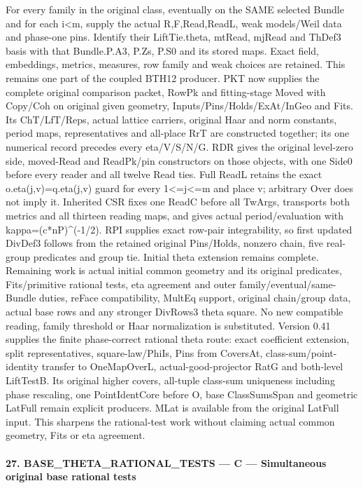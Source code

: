 \documentclass[11pt,a4paper]{article}
\numberwithin{equation}{section}
\theoremstyle{remark}\newtheorem{remark}[theorem]{Remark}
\begin{document}
For every family in the original class, eventually on the SAME selected Bundle and for each i<m, supply the actual R,F,Read,ReadL, weak models/Weil data and phase-one pins. Identify their LiftTie.theta, mtRead, mjRead and ThDef3 basis with that Bundle.P.A3, P.Zs, P.S0 and its stored maps. Exact field, embeddings, metrics, measures, row family and weak choices are retained. This remains one part of the coupled BTH12 producer. PKT now supplies the complete original comparison packet, RowPk and fitting-stage Moved with Copy/Coh on original given geometry, Inputs/Pins/Holds/ExAt/InGeo and Fits. Its ChT/LfT/Reps, actual lattice carriers, original Haar and norm constants, period maps, representatives and all-place RrT are constructed together; its one numerical record precedes every eta/V/S/N/G. RDR gives the original level-zero side, moved-Read and ReadPk/pin constructors on those objects, with one Side0 before every reader and all twelve Read ties. Full ReadL retains the exact o.eta(j,v)=q.eta(j,v) guard for every 1<=j<=m and place v; arbitrary Over does not imply it. Inherited CSR fixes one ReadC before all TwArgs, transports both metrics and all thirteen reading maps, and gives actual period/evaluation with kappa=(c*nP)\textasciicircum{}(-1/2). RPI supplies exact row-pair integrability, so first updated DivDef3 follows from the retained original Pins/Holds, nonzero chain, five real-group predicates and group tie. Initial theta extension remains complete. Remaining work is actual initial common geometry and its original predicates, Fits/primitive rational tests, eta agreement and outer family/eventual/same-Bundle duties, reFace compatibility, MultEq support, original chain/group data, actual base rows and any stronger DivRows3 theta square. No new compatible reading, family threshold or Haar normalization is substituted. Version 0.41 supplies the finite phase-correct rational theta route: exact coefficient extension, split representatives, square-law/PhiIs, Pins from CoversAt, class-sum/point-identity transfer to OneMapOverL, actual-good-projector RatG and both-level LiftTestB. Its original higher covers, all-tuple class-sum uniqueness including phase rescaling, one PointIdentCore before O, base ClassSumsSpan and geometric LatFull remain explicit producers. MLat is available from the original LatFull input. This sharpens the rational-test work without claiming actual common geometry, Fits or eta agreement.



\paragraph{27. BASE\_\allowbreak THETA\_\allowbreak RATIONAL\_\allowbreak TESTS — C — Simultaneous original base rational tests}
\end{document}
